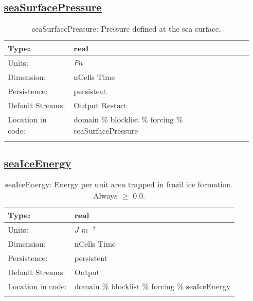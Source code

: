 \subsection[seaSurfacePressure]{\hyperref[sec:var_tab_forcing]{seaSurfacePressure}}
\label{subsec:var_sec_forcing_seaSurfacePressure}
\begin{center}
\begin{longtable}{| p{2.0in} | p{4.0in} |}
        \hline 
        Type: & real \\
        \hline 
        Units: & $Pa$ \\
        \hline 
        Dimension: & nCells Time \\
        \hline 
        Persistence: & persistent \\
        \hline 
		 Default Streams: & Output Restart  \\
        \hline 
		 Location in code: & domain \% blocklist \% forcing \% seaSurfacePressure \\
		 \hline 
    \caption{seaSurfacePressure: Pressure defined at the sea surface.}
\end{longtable}
\end{center}
\subsection[seaIceEnergy]{\hyperref[sec:var_tab_forcing]{seaIceEnergy}}
\label{subsec:var_sec_forcing_seaIceEnergy}
\begin{center}
\begin{longtable}{| p{2.0in} | p{4.0in} |}
        \hline 
        Type: & real \\
        \hline 
        Units: & $J$ $m^{-2}$ \\
        \hline 
        Dimension: & nCells Time \\
        \hline 
        Persistence: & persistent \\
        \hline 
		 Default Streams: & Output  \\
        \hline 
		 Location in code: & domain \% blocklist \% forcing \% seaIceEnergy \\
		 \hline 
    \caption{seaIceEnergy:  Energy per unit area trapped in frazil ice formation. Always  $\ge$  0.0.}
\end{longtable}
\end{center}

